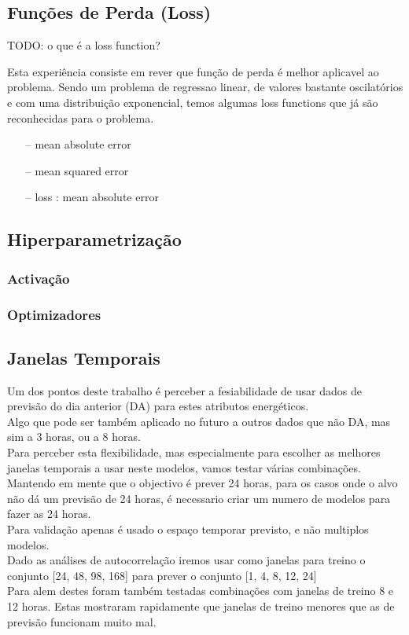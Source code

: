 \subsection{Funções de Perda (Loss)}

TODO: o que é a loss function?

Esta experiência consiste em rever que função de perda é melhor aplicavel ao problema. Sendo um problema de regressao linear, de valores bastante oscilatórios e com uma distribuição exponencial, temos algumas loss functions que já são reconhecidas para o problema.\\

\begin{itemize}
    \item[--] mean absolute error
    \item[--] mean squared error    
    \item[--] loss : mean absolute error

\end{itemize}



\subsection{Hiperparametrização}

\subsubsection{Activação}

\subsubsection{Optimizadores}

\subsection{Janelas Temporais}

Um dos pontos deste trabalho é perceber a fesiabilidade de usar dados de previsão do dia anterior (DA) para estes atributos energéticos.\\
Algo que pode ser também aplicado no futuro a outros dados que não DA, mas sim a 3 horas, ou a 8 horas.\\
Para perceber esta flexibilidade, mas especialmente para escolher as melhores janelas temporais a usar neste modelos, vamos testar várias combinações.\\
Mantendo em mente que o objectivo é prever 24 horas, para os casos onde o alvo não dá um previsão de 24 horas, é necessario criar um numero de modelos para fazer as 24 horas.\\
Para validação apenas é usado o espaço temporar previsto, e não multiplos modelos.\\
Dado as análises de autocorrelação iremos usar como janelas para treino o conjunto [24, 48, 98, 168] para prever o conjunto [1, 4, 8, 12, 24]\\
Para alem destes foram também testadas combinações com janelas de treino 8 e 12 horas. Estas mostraram rapidamente que janelas de treino menores que as de previsão funcionam muito mal.\\

